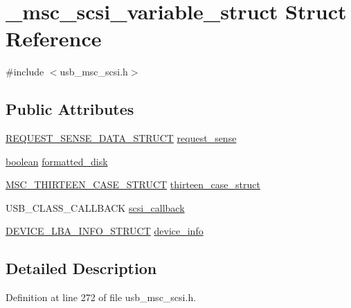 \hypertarget{struct__msc__scsi__variable__struct}{}\section{\+\_\+msc\+\_\+scsi\+\_\+variable\+\_\+struct Struct Reference}
\label{struct__msc__scsi__variable__struct}


{\ttfamily \#include $<$usb\+\_\+msc\+\_\+scsi.\+h$>$}

\subsection*{Public Attributes}
\begin{DoxyCompactItemize}
\item 
\hyperlink{usb__msc__scsi_8h_a0139e4680a9fc0662cc06bf80baffc17}{R\+E\+Q\+U\+E\+S\+T\+\_\+\+S\+E\+N\+S\+E\+\_\+\+D\+A\+T\+A\+\_\+\+S\+T\+R\+U\+CT} \hyperlink{struct__msc__scsi__variable__struct_a6d02e047131787b1a2a1f90b6477ac16}{request\+\_\+sense}
\item 
\hyperlink{types_8h_a7670a4e8a07d9ebb00411948b0bbf86d}{boolean} \hyperlink{struct__msc__scsi__variable__struct_abd1f4cc36cfc9fb40897faa44cb1030c}{formatted\+\_\+disk}
\item 
\hyperlink{usb__msc_8h_aa573419245f83ee682edb875351049b0}{M\+S\+C\+\_\+\+T\+H\+I\+R\+T\+E\+E\+N\+\_\+\+C\+A\+S\+E\+\_\+\+S\+T\+R\+U\+CT} \hyperlink{struct__msc__scsi__variable__struct_ac93c46a41306d4e964303bdea2de1de0}{thirteen\+\_\+case\+\_\+struct}
\item 
U\+S\+B\+\_\+\+C\+L\+A\+S\+S\+\_\+\+C\+A\+L\+L\+B\+A\+CK \hyperlink{struct__msc__scsi__variable__struct_a14d46998a82cc9c08b45ea6929d382e1}{scsi\+\_\+callback}
\item 
\hyperlink{usb__msc_8h_adf6420ffba647e8640587e01109be442}{D\+E\+V\+I\+C\+E\+\_\+\+L\+B\+A\+\_\+\+I\+N\+F\+O\+\_\+\+S\+T\+R\+U\+CT} \hyperlink{struct__msc__scsi__variable__struct_aeb46e853870e145e3dab553cba983829}{device\+\_\+info}
\end{DoxyCompactItemize}


\subsection{Detailed Description}


Definition at line 272 of file usb\+\_\+msc\+\_\+scsi.\+h.



